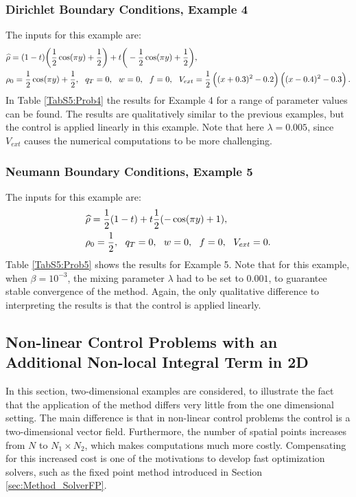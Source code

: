 \subsubsection{Dirichlet Boundary Conditions, Example 4}
The inputs for this example are:
\begin{align*}
&\widehat \rho = (1 - t)\bigg(\frac{1}{2}\cos(\pi y) + \frac{1}{2}\bigg)  + t\bigg(-\frac{1}{2}\cos(\pi y) + \frac{1}{2}\bigg),\\
&\rho_{0} = \frac{1}{2}\cos(\pi y) + \frac{1}{2},\ \
q_{T} = 0,\ \
{w} = 0,\ \
f =0, \ \
V_{ext} =\frac{1}{2}\left((x + 0.3)^2 - 0.2\right)\left((x-0.4)^2 - 0.3\right).
\end{align*}
In Table \ref{TabS5:Prob4} the results for Example 4 for a range of parameter values can be found. The results are qualitatively similar to the previous examples, but the control is applied linearly in this example. Note that here $\lambda = 0.005$, since $V_{{ext}}$ causes the numerical computations to be more challenging.




\subsubsection{Neumann Boundary Conditions, Example 5}
The inputs for this example are:
\begin{align*}
&\widehat \rho = \frac{1}{2}(1-t) + t\frac{1}{2}(-\cos(\pi y) + 1),\\
&\rho_{0} = \frac{1}{2},\ \
q_{T} = 0,\ \
{w} = 0,\ \
f =0,\ \
V_{ext} =0.
\end{align*}
Table \ref{TabS5:Prob5} shows the results for Example 5. Note that for this example, when $\beta = 10^{-3}$, the mixing parameter $\lambda$ had to be set to $0.001$, to guarantee stable convergence of the method.
Again, the only qualitative difference to interpreting the results is that the control is applied linearly.


\subsection{Non-linear Control Problems with an Additional Non-local Integral Term in 2D}
In this section, two-dimensional examples are considered, to illustrate the fact that the application of the method differs very little from the one dimensional setting. The main difference is that in non-linear control problems the control is a two-dimensional vector field. Furthermore, the number of spatial points increases from $N$ to $N_1\times N_2$, which makes computations much more costly. Compensating for this increased cost is one of the motivations to develop fast optimization solvers, such as the fixed point method introduced in Section \ref{sec:Method_SolverFP}.
